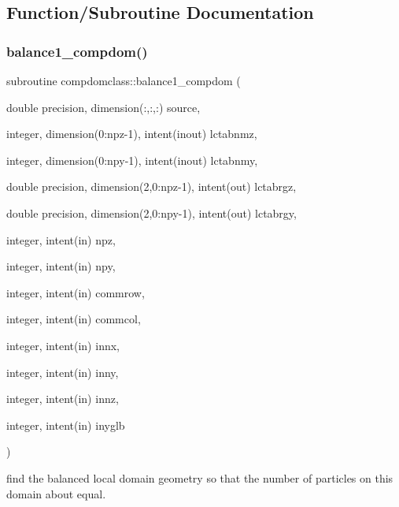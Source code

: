 \subsection{Function/\+Subroutine Documentation}
\mbox{\label{namespacecompdomclass_aab3fa2d18dbc8bc4d825e36304c4b4d8}} 
\subsubsection{\texorpdfstring{balance1\_compdom()}{balance1\_compdom()}}
{\footnotesize\ttfamily subroutine compdomclass\+::balance1\+\_\+compdom (\begin{DoxyParamCaption}\item[{double precision, dimension(\+:,\+:,\+:)}]{source,  }\item[{integer, dimension(0\+:npz-\/1), intent(inout)}]{lctabnmz,  }\item[{integer, dimension(0\+:npy-\/1), intent(inout)}]{lctabnmy,  }\item[{double precision, dimension(2,0\+:npz-\/1), intent(out)}]{lctabrgz,  }\item[{double precision, dimension(2,0\+:npy-\/1), intent(out)}]{lctabrgy,  }\item[{integer, intent(in)}]{npz,  }\item[{integer, intent(in)}]{npy,  }\item[{integer, intent(in)}]{commrow,  }\item[{integer, intent(in)}]{commcol,  }\item[{integer, intent(in)}]{innx,  }\item[{integer, intent(in)}]{inny,  }\item[{integer, intent(in)}]{innz,  }\item[{integer, intent(in)}]{inyglb }\end{DoxyParamCaption})}



find the balanced local domain geometry so that the number of particles on this domain about equal. 

\mbox{\label{namespacecompdomclass_a6d30ed07486cc6d7f9bf0e87f948e807}} 
